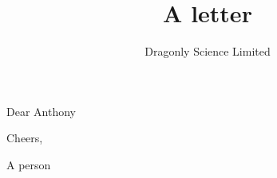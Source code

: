 \documentclass{dragonfly-letter}
\title{A letter}
\author{Dragonly Science Limited}
\begin{document}
\maketitle

Dear Anthony

\lipsum[1-7]

Cheers,

A person
\end{document}
